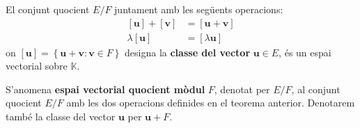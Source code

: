 \begin{teorema}
El conjunt quocient $E/F$ juntament amb les següents operacions:%
\begin{align*}
\left[ \mathbf{u}\right] +\left[ \mathbf{v}\right] &=\left[ \mathbf{u}+%
\mathbf{v}\right] \\
\lambda \left[ \mathbf{u}\right] &=\left[ \lambda \mathbf{u}\right]
\end{align*}%
on $\left[ \mathbf{u}\right] =\left\{ \mathbf{u}+\mathbf{v}:\mathbf{v}%
\in F\right\} $ designa la \textbf{classe del vector} $\mathbf{u}\in 
E$, és un espai vectorial sobre $\mathbb{K}$.
\end{teorema}

\begin{definicio}
S’anomena \textbf{espai vectorial quocient mòdul} $F$,
denotat per $E/F$, al conjunt quocient $E/F$ amb les dos
operacions definides en el teorema anterior. Denotarem també la
classe del vector $\mathbf{u}$ per $\mathbf{u}+F$.
\end{definicio}

